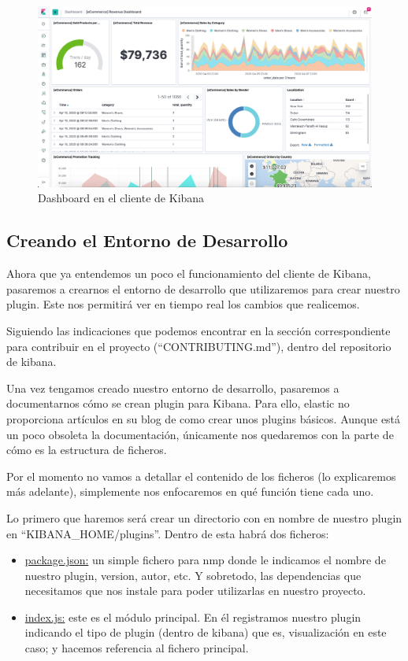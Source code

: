 \documentclass[a4paper, 12pt]{book}
\begin{document}
\begin{figure}[H]
  \centering
  \includegraphics[width=12cm, keepaspectratio]{img/development/kibana-dashboard.png}
  \caption{Dashboard en el cliente de Kibana}
  \label{fig:kibanadashboard}
\end{figure}


\subsection{Creando el Entorno de Desarrollo}

Ahora que ya entendemos un poco el funcionamiento del cliente de Kibana, pasaremos a crearnos el entorno de desarrollo que utilizaremos para crear nuestro plugin. Este nos permitirá ver en tiempo real los cambios que realicemos.

Siguiendo las indicaciones que podemos encontrar en la sección correspondiente para contribuir en el proyecto (“CONTRIBUTING.md”), dentro del repositorio de kibana.

Una vez tengamos creado nuestro entorno de desarrollo, pasaremos a documentarnos cómo se crean plugin para Kibana. Para ello, elastic no proporciona artículos en su blog de como crear unos plugins básicos. Aunque está un poco obsoleta la documentación, únicamente nos quedaremos con la parte de cómo es la estructura de ficheros.

Por el momento no vamos a detallar el contenido de los ficheros (lo explicaremos más adelante), simplemente nos enfocaremos en qué función tiene cada uno.

Lo primero que haremos será crear un directorio con en nombre de nuestro plugin en “KIBANA\_HOME/plugins”. Dentro de esta habrá dos ficheros:

\begin{itemize}
    \item \underline{package.json:} un simple fichero para nmp donde le indicamos el nombre de nuestro plugin, version, autor, etc. Y sobretodo, las dependencias que necesitamos que nos instale para poder utilizarlas en nuestro proyecto.
    \item \underline{index.js:} este es el módulo principal. En él registramos nuestro plugin indicando el tipo de plugin (dentro de kibana) que es, visualización en este caso; y hacemos referencia al fichero principal.
\end{itemize}
\end{document}

